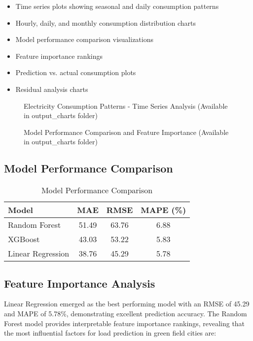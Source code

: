 \documentclass[12pt,a4paper]{article}
\begin{document}
\begin{itemize}
    \item Time series plots showing seasonal and daily consumption patterns
    \item Hourly, daily, and monthly consumption distribution charts
    \item Model performance comparison visualizations
    \item Feature importance rankings
    \item Prediction vs. actual consumption plots
    \item Residual analysis charts
\end{itemize}

\begin{figure}[H]
    \centering
    \caption{Electricity Consumption Patterns - Time Series Analysis (Available in output\_charts folder)}
    \label{fig:consumption_patterns}
\end{figure}

\begin{figure}[H]
    \centering
    \caption{Model Performance Comparison and Feature Importance (Available in output\_charts folder)}
    \label{fig:model_performance}
\end{figure}

\subsection{Model Performance Comparison}
\begin{table}[H]
\centering
\caption{Model Performance Comparison}
\begin{tabular}{@{}lccc@{}}
\toprule
\textbf{Model} & \textbf{MAE} & \textbf{RMSE} & \textbf{MAPE (\%)} \\
\midrule
Random Forest & 51.49 & 63.76 & 6.88 \\
XGBoost & 43.03 & 53.22 & 5.83 \\
Linear Regression & 38.76 & 45.29 & 5.78 \\
\bottomrule
\end{tabular}
\label{tab:model_performance}
\end{table}

\subsection{Feature Importance Analysis}
Linear Regression emerged as the best performing model with an RMSE of 45.29 and MAPE of 5.78\%, demonstrating excellent prediction accuracy. The Random Forest model provides interpretable feature importance rankings, revealing that the most influential factors for load prediction in green field cities are:
\end{document}
